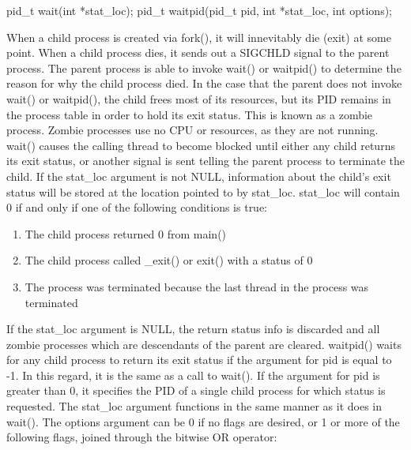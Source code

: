 \documentclass{article}
\begin{document}
\begin{clst}

pid_t wait(int *stat_loc);
pid_t waitpid(pid_t pid, int *stat_loc, int options);

\end{clst}

When a child process is created via fork(), it will innevitably die (exit) at some point. When a child process
dies, it sends out a SIGCHLD signal to the parent process. The parent process is able to invoke wait() or
waitpid() to determine the reason for why the child process died. In the case that the parent does not invoke
wait() or waitpid(), the child frees most of its resources, but its PID remains in the process table in order
to hold its exit status. This is known as a zombie process. Zombie processes use no CPU or resources, as they
are not running. wait() causes the calling thread to become blocked until either any child returns its exit
status, or another signal is sent telling the parent process to terminate the child. If the stat\_loc argument
is not NULL, information about the child's exit status will be stored at the location pointed to by stat\_loc.
stat\_loc will contain 0 if and only if one of the following conditions is true:

\begin{enumerate}

\item{The child process returned 0 from main()}

\item{The child process called \_exit() or exit() with a status of 0}

\item{The process was terminated because the last thread in the process was terminated}

\end{enumerate}

If the stat\_loc argument is NULL, the return status info is discarded and all zombie processes which are
descendants of the parent are cleared. waitpid() waits for any child process to return its exit status if the
argument for pid is equal to -1. In this regard, it is the same as a call to wait(). If the argument for pid
is greater than 0, it specifies the PID of a single child process for which status is requested. The stat\_loc
argument functions in the same manner as it does in wait(). The options argument can be 0 if no flags are
desired, or 1 or more of the following flags, joined through the bitwise OR operator:
\end{document}
